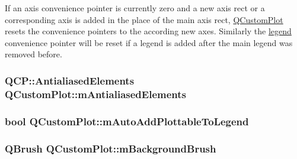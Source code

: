 If an axis convenience pointer is currently zero and a new axis rect or a corresponding axis is added in the place of the main axis rect, \hyperlink{class_q_custom_plot}{Q\+Custom\+Plot} resets the convenience pointers to the according new axes. Similarly the \hyperlink{class_q_custom_plot_a4eadcd237dc6a09938b68b16877fa6af}{legend} convenience pointer will be reset if a legend is added after the main legend was removed before. 
\subsubsection[{\texorpdfstring{m\+Antialiased\+Elements}{mAntialiasedElements}}]{\setlength{\rightskip}{0pt plus 5cm}Q\+C\+P\+::\+Antialiased\+Elements Q\+Custom\+Plot\+::m\+Antialiased\+Elements\hspace{0.3cm}{\ttfamily [protected]}}\hypertarget{class_q_custom_plot_aa333200629256830e273873b582a5524}{}\label{class_q_custom_plot_aa333200629256830e273873b582a5524}
\subsubsection[{\texorpdfstring{m\+Auto\+Add\+Plottable\+To\+Legend}{mAutoAddPlottableToLegend}}]{\setlength{\rightskip}{0pt plus 5cm}bool Q\+Custom\+Plot\+::m\+Auto\+Add\+Plottable\+To\+Legend\hspace{0.3cm}{\ttfamily [protected]}}\hypertarget{class_q_custom_plot_aaf3ea6a4cb04d35a149cc9a0cdac3394}{}\label{class_q_custom_plot_aaf3ea6a4cb04d35a149cc9a0cdac3394}
\subsubsection[{\texorpdfstring{m\+Background\+Brush}{mBackgroundBrush}}]{\setlength{\rightskip}{0pt plus 5cm}Q\+Brush Q\+Custom\+Plot\+::m\+Background\+Brush\hspace{0.3cm}{\ttfamily [protected]}}\hypertarget{class_q_custom_plot_a3aef5de4ac012178e3293248e9c63737}{}\label{class_q_custom_plot_a3aef5de4ac012178e3293248e9c63737}
